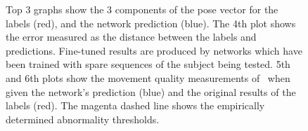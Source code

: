 \documentclass[11pt]{article} %
\begin{document}
\begin{figure}
\ContinuedFloat
\centering
%
\qquad%
%
\caption{Top 3 graphs show the 3 components of the pose vector for the labels (red), and the network prediction (blue). The 4th plot shows the error measured as the distance between the labels and predictions. Fine-tuned results are produced by networks which have been trained with spare sequences of the subject being tested. 5th and 6th plots show the movement quality measurements of~\cite{Paiement} when given the network's prediction (blue) and the original results of the labels (red). The magenta dashed line shows the empirically determined abnormality thresholds. }
\label{fig:s7-12}
\end{figure}
\end{document}

